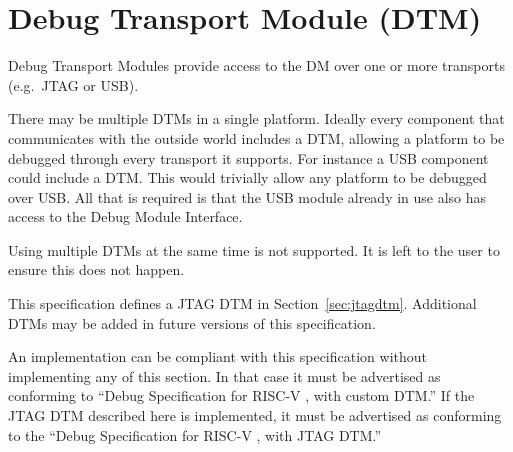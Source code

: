 \chapter{Debug Transport Module (DTM)} \label{dtm}

Debug Transport Modules provide access to the DM over one or more transports
(e.g.\ JTAG or USB).

There may be multiple DTMs in a single platform. Ideally every component that
communicates with the outside world includes a DTM, allowing a platform to be
debugged through every transport it supports.  For instance a USB component
could include a DTM. This would trivially allow any platform to be debugged
over USB. All that is required is that the USB module already in use also has
access to the Debug Module Interface.

Using multiple DTMs at the same time is not supported. It is left to the user
to ensure this does not happen.

This specification defines a JTAG DTM in Section~\ref{sec:jtagdtm}. Additional DTMs
may be added in future versions of this specification.

An implementation can be compliant with this specification without implementing
any of this section. In that case it must be advertised as conforming to
``Debug Specification for RISC-V \versionnum, with custom DTM.'' If the JTAG DTM
described here is implemented, it must be advertised as conforming to the
``Debug Specification for RISC-V \versionnum, with JTAG DTM.''


